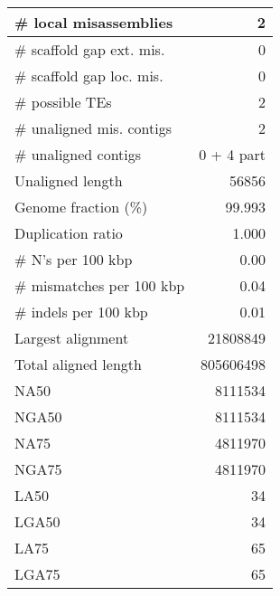 \documentclass[12pt,a4paper]{article}
\begin{document}
\begin{table}[ht]
\begin{center}
\begin{tabular}{|l*{1}{|r}|}
\# local misassemblies & 2 \\ \hline
\# scaffold gap ext. mis. & 0 \\ \hline
\# scaffold gap loc. mis. & 0 \\ \hline
\# possible TEs & 2 \\ \hline
\# unaligned mis. contigs & 2 \\ \hline
\# unaligned contigs & 0 + 4 part \\ \hline
Unaligned length & 56856 \\ \hline
Genome fraction (\%) & 99.993 \\ \hline
Duplication ratio & 1.000 \\ \hline
\# N's per 100 kbp & 0.00 \\ \hline
\# mismatches per 100 kbp & 0.04 \\ \hline
\# indels per 100 kbp & 0.01 \\ \hline
Largest alignment & 21808849 \\ \hline
Total aligned length & 805606498 \\ \hline
NA50 & 8111534 \\ \hline
NGA50 & 8111534 \\ \hline
NA75 & 4811970 \\ \hline
NGA75 & 4811970 \\ \hline
LA50 & 34 \\ \hline
LGA50 & 34 \\ \hline
LA75 & 65 \\ \hline
LGA75 & 65 \\ \hline
\end{tabular}
\end{center}
\end{table}
\end{document}
